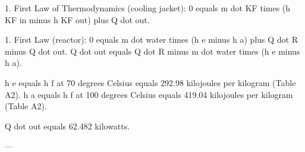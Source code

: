 1. First Law of Thermodynamics (cooling jacket):  
0 equals m dot KF times (h KF in minus h KF out) plus Q dot out.  

1. First Law (reactor):  
0 equals m dot water times (h e minus h a) plus Q dot R minus Q dot out.  
Q dot out equals Q dot R minus m dot water times (h e minus h a).  

h e equals h f at 70 degrees Celsius equals 292.98 kilojoules per kilogram (Table A2).  
h a equals h f at 100 degrees Celsius equals 419.04 kilojoules per kilogram (Table A2).  

Q dot out equals 62.482 kilowatts.  

---